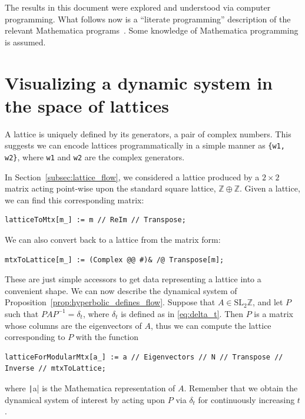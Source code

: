 \documentclass[12pt,twoside]{reedthesis}
\theoremstyle{definition}
\newcommand{\Z}{\mathbb{Z}}
\newcommand{\SLZ}{\mathrm{SL}_2{\Z}}
\begin{document}
The results in this document were explored and understood via computer programming.
What follows now is a ``literate programming'' description of the relevant Mathematica programs~\cite{knuth1992}.
Some knowledge of Mathematica programming is assumed.

\newpage

\section{Visualizing a dynamic system in the space of lattices}

A lattice is uniquely defined by its generators, a pair of complex numbers.
This suggests we can encode lattices programmatically in a simple manner as \texttt{\{w1, w2\}}, where \texttt{w1} and \texttt{w2} are the complex generators. 

In Section~\ref{subsec:lattice_flow}, we considered a lattice produced by a $2 \times 2$ matrix acting point-wise upon the standard square lattice, $\Z \oplus \Z$.
Given a lattice, we can find this corresponding matrix:
\begin{verbatim}
latticeToMtx[m_] := m // ReIm // Transpose;
\end{verbatim}
We can also convert back to a lattice from the matrix form:
\begin{verbatim}
mtxToLattice[m_] := (Complex @@ #)& /@ Transpose[m];
\end{verbatim}
These are just simple accessors to get data representing a lattice into a convenient shape.
We can now describe the dynamical system of Proposition~\ref{prop:hyperbolic_defines_flow}.
Suppose that $A \in \SLZ$, and let $P$ such that $PAP^{-1} = \delta_t$, where $\delta_t$ is defined as in \eqref{eq:delta_t}.
Then $P$ is a matrix whose columns are the eigenvectors of $A$, thus we can compute the lattice corresponding to $P$ with the function 
\begin{verbatim}
latticeForModularMtx[a_] := a // Eigenvectors // N // Transpose // Inverse // mtxToLattice;
\end{verbatim}
where \texttt|a| is the Mathematica representation of $A$.
Remember that we obtain the dynamical system of interest by acting upon $P$ via $\delta_t$ for continuously increasing $t$.
\end{document}
